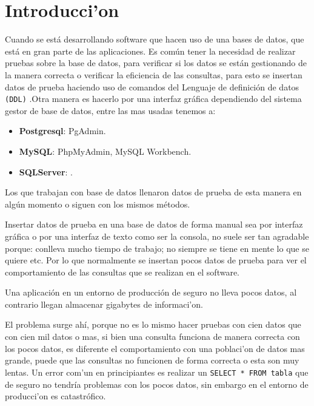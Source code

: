 
\chapter{Introducci'on}

Cuando se est\'a desarrollando software que hacen  uso de una bases de datos, que est\'a en gran parte de las aplicaciones. Es com\'un tener la necesidad de realizar pruebas sobre la base de datos, para verificar si los datos se est\'an gestionando de la manera correcta o verificar la eficiencia  de las consultas, para esto se insertan datos de prueba haciendo uso de comandos del Lenguaje de definici\'on de datos \texttt{(DDL)} \cite{ddl}.Otra manera es hacerlo por una interfaz gr\'afica dependiendo del sistema gestor de base de datos, entre las mas usadas tenemos a:
\begin{itemize}
\item \textbf{Postgresql}: PgAdmin.
\item \textbf{MySQL}: PhpMyAdmin, MySQL Workbench.
\item \textbf{SQLServer}: .
\end{itemize}
Los que trabajan con base de datos llenaron datos de prueba de esta manera en alg\'un momento o siguen con los mismos m\'etodos.

Insertar datos de prueba en una base de datos de forma manual sea por interfaz gr\'afica o por una interfaz de texto como ser la consola, no suele ser tan agradable porque: conlleva mucho tiempo de trabajo; no siempre se tiene en mente lo que se quiere etc. Por lo que normalmente se insertan pocos datos de prueba para ver el comportamiento de las consultas que se realizan en el software. 

Una aplicaci\'on en un entorno de producci\'on de seguro no lleva pocos datos, al contrario llegan almacenar gigabytes de informaci'on.

El problema surge ah\'i, porque no es lo mismo hacer pruebas con cien datos que con cien mil datos o mas, si bien una consulta funciona de manera correcta con los pocos datos, es diferente el comportamiento con una poblaci'on de datos mas grande, puede que las consultas no funcionen de forma correcta o esta son muy lentas. Un error com'un en principiantes es realizar un \texttt{SELECT * FROM tabla} que de seguro no tendr\'ia problemas con los pocos datos, sin embargo en el entorno de producci'on es catastr\'ofico. 

